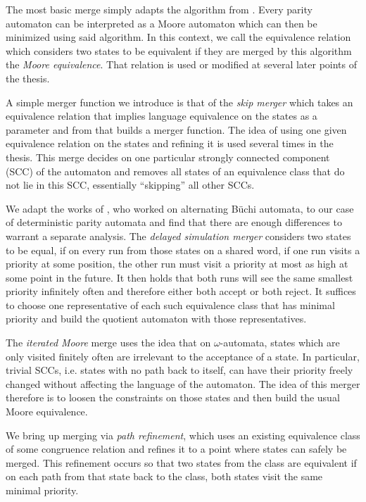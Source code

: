 The most basic merge simply adapts the algorithm from \cite{Hopcroft1971}. Every parity automaton can be interpreted as a Moore automaton which can then be minimized using said algorithm. In this context, we call the equivalence relation which considers two states to be equivalent if they are merged by this algorithm the \emph{Moore equivalence}. That relation is used or modified at several later points of the thesis.

A simple merger function we introduce is that of the \emph{skip merger} which takes an equivalence relation that implies language equivalence on the states as a parameter and from that builds a merger function. The idea of using one given equivalence relation on the states and refining it is used several times in the thesis. This merge decides on one particular strongly connected component (SCC) of the automaton and removes all states of an equivalence class that do not lie in this SCC, essentially \enquote{skipping} all other SCCs.

We adapt the works of \cite{FritzWilke06}, who worked on alternating Büchi automata, to our case of deterministic parity automata and find that there are enough differences to warrant a separate analysis. The \emph{delayed simulation merger} considers two states to be equal, if on every run from those states on a shared word, if one run visits a priority at some position, the other run must visit a priority at most as high at some point in the future. It then holds that both runs will see the same smallest priority infinitely often and therefore either both accept or both reject. It suffices to choose one representative of each such equivalence class that has minimal priority and build the quotient automaton with those representatives.

The \emph{iterated Moore} merge uses the idea that on $\omega$-automata, states which are only visited finitely often are irrelevant to the acceptance of a state. In particular, trivial SCCs, i.e. states with no path back to itself, can have their priority freely changed without affecting the language of the automaton. The idea of this merger therefore is to loosen the constraints on those states and then build the usual Moore equivalence.

We bring up merging via \emph{path refinement}, which uses an existing equivalence class of some congruence relation and refines it to a point where states can safely be merged. This refinement occurs so that two states from the class are equivalent if on each path from that state back to the class, both states visit the same minimal priority. 

